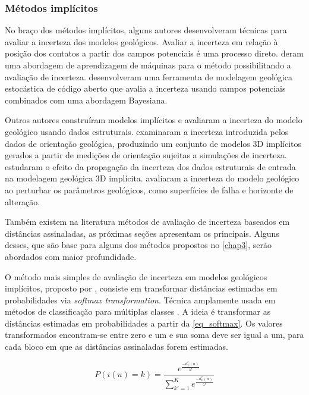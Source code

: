 \subsubsection{Métodos implícitos}

No braço dos métodos implícitos, alguns autores desenvolveram técnicas para avaliar a incerteza dos modelos geológicos. Avaliar a incerteza em relação à posição dos contatos a partir dos campos potenciais é uma  processo direto.  deram uma abordagem de aprendizagem de máquinas para o método possibilitando a avaliação de incerteza.  desenvolveram uma ferramenta de modelagem geológica estocástica de código aberto que avalia a incerteza usando campos potenciais combinados com uma abordagem Bayesiana.

Outros autores construíram modelos implícitos e avaliaram a incerteza do modelo geológico usando dados estruturais.  examinaram a incerteza introduzida pelos dados de orientação geológica, produzindo um conjunto de modelos 3D implícitos gerados a partir de medições de orientação sujeitas a simulações de incerteza.  estudaram o efeito da propagação da incerteza dos dados estruturais de entrada na modelagem geológica 3D implícita.  avaliaram a incerteza do modelo geológico ao perturbar os parâmetros geológicos, como superfícies de falha e horizonte de alteração.

Também existem na literatura métodos de avaliação de incerteza baseados em distâncias assinaladas, as próximas seções apresentam os principais. Alguns desses, que são base para alguns dos métodos propostos no \autoref{chap3}, serão abordados com maior profundidade.

\label{heuristic}

O método mais simples de avaliação de incerteza em modelos geológicos implícitos, proposto por , consiste em transformar distâncias estimadas em probabilidades via \textit{softmax transformation}. Técnica amplamente usada em métodos de classificação para múltiplas classes \cite{mccullaghgeneralizedlinear}. A ideia é transformar as distâncias estimadas em probabilidades a partir da \autoref{eq_softmax}. Os valores transformados encontram-se entre zero e um e sua soma deve ser igual a um, para cada bloco em que as distâncias assinaladas forem estimadas.

\begin{equation}
	P(i(u)=k)=\frac{e^\frac{-d^*_k(u)}{\omega}}{\sum_{k'=1}^{K}e^\frac{-d^*_k(u)}{\omega}}
    \label{eq_softmax}
\end{equation}

